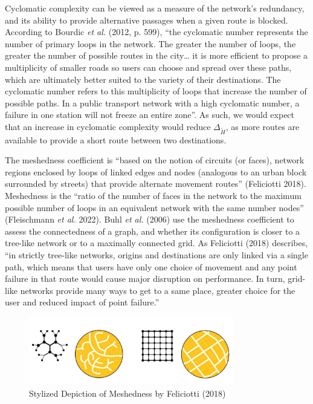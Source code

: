 \documentclass[
  10pt,
]{article}
\begin{document}
Cyclomatic complexity can be viewed as a measure of the network's
redundancy, and its ability to provide alternative passages when a given
route is blocked. According to Bourdic \emph{et al.} (2012, p. 599),
``the cyclomatic number represents the number of primary loops in the
network. The greater the number of loops, the greater the number of
possible routes in the city\ldots{} it is more efficient to propose a
multiplicity of smaller roads so users can choose and spread over these
paths, which are ultimately better suited to the variety of their
destinations. The cyclomatic number refers to this multiplicity of loops
that increase the number of possible paths. In a public transport
network with a high cyclomatic number, a failure in one station will not
freeze an entire zone''. As such, we would expect that an increase in
cyclomatic complexity would reduce \(\Delta_{\tilde{H}}\), as more
routes are available to provide a short route between two destinations.

The meshedness coefficient is ``based on the notion of circuits (or
faces), network regions enclosed by loops of linked edges and nodes
(analogous to an urban block surrounded by streets) that provide
alternate movement routes'' (Feliciotti 2018). Meshedness is the ``ratio
of the number of faces in the network to the maximum possible number of
loops in an equivalent network with the same number nodes'' (Fleischmann
\emph{et al.} 2022). Buhl \emph{et al.} (2006) use the meshedness
coefficient to assess the connectedness of a graph, and whether its
configuration is closer to a tree-like network or to a maximally
connected grid. As Feliciotti (2018) describes, ``in strictly tree-like
networks, origins and destinations are only linked via a single path,
which means that users have only one choice of movement and any point
failure in that route would cause major disruption on performance. In
turn, grid-like networks provide many ways to get to a same place,
greater choice for the user and reduced impact of point failure.''

\begin{figure}
\hypertarget{fig:meshedness}{%
\centering
\includegraphics[width=0.8\textwidth,height=\textheight]{./meshedness.png}
\caption{Stylized Depiction of Meshedness by Feliciotti
(2018)}\label{fig:meshedness}
}
\end{figure}
\end{document}

